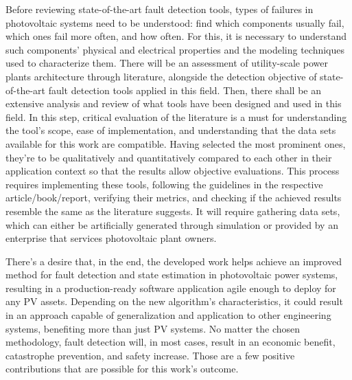 Before reviewing state-of-the-art fault detection tools, types of failures in photovoltaic systems need to be understood: find which components usually fail, which ones fail more often, and how often. For this, it is necessary to understand such components' physical and electrical properties and the modeling techniques used to characterize them. There will be an assessment of utility-scale power plants architecture through literature, alongside the detection objective of state-of-the-art fault detection tools applied in this field. Then, there shall be an extensive analysis and review of what tools have been designed and used in this field. In this step, critical evaluation of the literature is a must for understanding the tool's scope, ease of implementation, and understanding that the data sets available for this work are compatible. Having selected the most prominent ones, they're to be qualitatively and quantitatively compared to each other in their application context so that the results allow objective evaluations. This process requires implementing these tools, following the guidelines in the respective article/book/report, verifying their metrics, and checking if the achieved results resemble the same as the literature suggests. It will require gathering data sets, which can either be artificially generated through simulation or provided by an enterprise that services photovoltaic plant owners.


There's a desire that, in the end, the developed work helps achieve an improved method for fault detection and state estimation in photovoltaic power systems, resulting in a production-ready software application agile enough to deploy for any PV assets. Depending on the new algorithm's characteristics, it could result in an approach capable of generalization and application to other engineering systems, benefiting more than just PV systems. No matter the chosen methodology, fault detection will, in most cases, result in an economic benefit, catastrophe prevention, and safety increase. Those are a few positive contributions that are possible for this work's outcome.